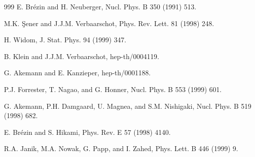 \begin{thebibliography}{999}
 E. Br\'ezin and  H. Neuberger,  
                       Nucl. Phys. B 350 (1991) 513.        %

      M.K. \c Sener and J.J.M. Verbaarschot,
                      Phys. Rev. Lett. 81 (1998) 248.       %

      H. Widom, 
                      J. Stat. Phys. 94 (1999) 347.                 %

     B. Klein and J.J.M. Verbaarschot,
                      hep-th/0004119.

 G. Akemann and E. Kanzieper,
                      hep-th/0001188.                               %

 P.J. Forrester, T. Nagao, and G. Honner,
                      Nucl. Phys. B 553 (1999) 601.        %

      G. Akemann, P.H. Damgaard, U. Magnea, and S.M. Nishigaki,
                      Nucl. Phys. B 519 (1998) 682.        %

 E. Br\'ezin and S. Hikami, 
                      Phys. Rev. E 57 (1998) 4140.         %

     R.A. Janik, M.A. Nowak, G. Papp, and I. Zahed,
                      Phys. Lett. B 446 (1999) 9.          %


\end{thebibliography}
